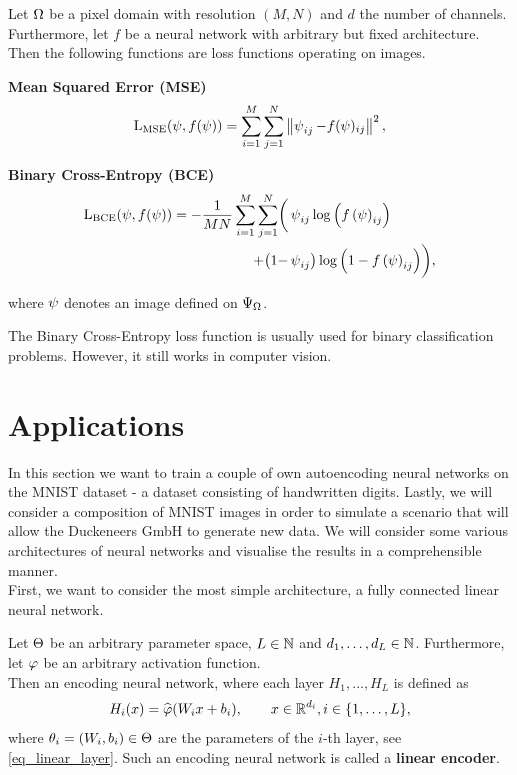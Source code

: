 \begin{example}
Let $\Omega$ be a pixel domain with resolution $(M,N)$ and $d$ the number of channels. Furthermore, let $f$ be a neural network with arbitrary but fixed architecture.\\
Then the following functions are loss functions operating on images.
\begin{mydescription}{}
\item[\textbf{Mean Squared Error (MSE)}] \begin{align*}
\operatorname{L_\text{MSE}}(\operatorname{\psi}, f(\operatorname{\psi})) = \sum_{i=1}^{M}\sum_{j=1}^{N}\left\|\operatorname{\psi}_{ij} - f(\operatorname{\psi})_{ij}\right\|^2,
\end{align*}
\item[\textbf{Binary Cross-Entropy (BCE)}]
\begin{align*}
\operatorname{L_\text{BCE}}(\operatorname{\psi}, f(\operatorname{\psi})) = - \frac{1}{MN}\sum_{i=1}^{M}\sum_{j=1}^{N} \biggl(&\operatorname{\psi}_{ij} \log\left(f\left(\operatorname{\psi}\right)_{ij}\right)\\ + \bigl(1-&\operatorname{\psi}_{ij}\bigr)\log\left(1 - f\left(\operatorname{\psi}\right)_{ij}\right)\biggr),
\end{align*}
\end{mydescription}
where $\operatorname{\psi}$ denotes an image defined on $\Psi_{\Omega}$.
\end{example}


\begin{remark}
The Binary Cross-Entropy loss function is usually used for binary classification problems. However, it still works in computer vision.
\end{remark}


\section{Applications}

In this section we want to train a couple of own autoencoding neural networks on the MNIST dataset - a dataset consisting of handwritten digits. Lastly, we will consider a composition of MNIST images in order to simulate a scenario that will allow the Duckeneers GmbH to generate new data. We will consider some various architectures of neural networks and visualise the results in a comprehensible manner.\\
First, we want to consider the most simple architecture, a fully connected linear neural network.

\begin{definition}\label{def_linear_encoder}
Let $\operatorname{\Theta}$ be an arbitrary parameter space, $L\in \operatorname{\mathbb{N}}$ and $d_1,\ldots,d_L \in \operatorname{\mathbb{N}}$. Furthermore, let $\operatorname{\varphi}$ be an arbitrary activation function.\\
Then an encoding neural network, where each layer $H_1,\ldots, H_L$ is defined as
\begin{align*}
H_i(x) = \widehat{\operatorname{\varphi}}(W_ix + b_i), \qquad x \in \operatorname{\mathbb{R}}^{d_i}, i \in \{1,\ldots, L\},
\end{align*}
where $\theta_i = (W_i, b_i)\in\operatorname{\Theta}$ are the parameters of the $i$-th layer, see \eqref{eq_linear_layer}. Such an encoding neural network is called a \textbf{linear encoder}.
\end{definition}


